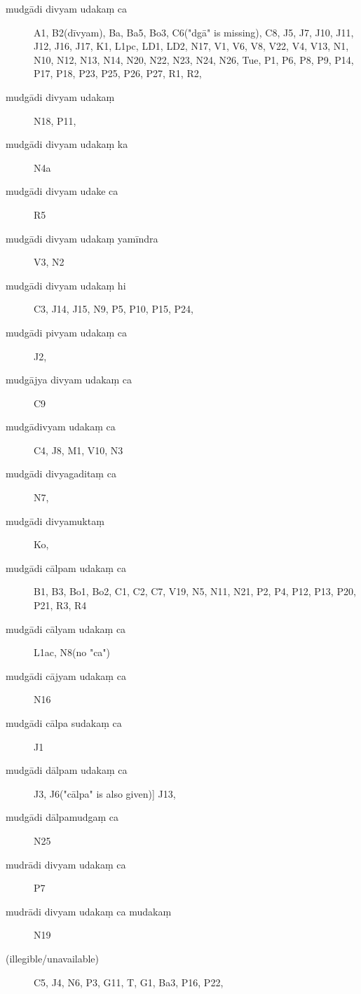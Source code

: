 \begin{ekdosis}
\begin{marma}[hp01_055]
      
\begin{marma}[hp01_062]
  \begin{description}
  \item[mudgādi divyam udakaṃ ca] A1, B2(dīvyam), Ba, Ba5, Bo3, C6("dgā" is missing), C8, J5, J7, J10, J11, J12, J16, J17, K1, L1pc, LD1, LD2, N17, V1, V6, V8, V22, V4, V13, N1, N10, N12, N13, N14, N20, N22, N23, N24, N26, Tue, P1, P6, P8, P9, P14, P17, P18, P23, P25, P26, P27, R1, R2,
\item[mudgādi divyam udakaṃ]   N18, P11,
\item[mudgādi divyam udakaṃ ka]   N4a
\item[mudgādi divyam udake ca]   R5
\item[mudgādi divyam udakaṃ yamīndra]    V3, N2
\item[mudgādi divyam udakaṃ hi]    C3, J14, J15, N9, P5, P10, P15, P24, 
\item[mudgādi pivyam udakaṃ ca]    J2,
\item[mudgājya divyam udakaṃ ca]    C9
\item[mudgādivyam udakaṃ ca]    C4, J8, M1, V10, N3
\item[mudgādi divyagaditaṃ ca]   N7,
\item[mudgādi divyamuktaṃ]    Ko,
\item[mudgādi cālpam udakaṃ ca]    B1, B3, Bo1, Bo2, C1, C2, C7, V19, N5, N11, N21, P2, P4, P12, P13, P20, P21, R3, R4
\item[mudgādi cālyam udakaṃ ca]    L1ac, N8(no "ca")
\item[mudgādi cājyam udakaṃ ca]    N16
\item[mudgādi cālpa sudakaṃ ca]     J1
\item[mudgādi dālpam udakaṃ ca]    J3, J6("cālpa" is also given)] J13,
\item[mudgādi dālpamudgaṃ ca]    N25
\item[mudrādi divyam udakaṃ ca]  P7
\item[mudrādi divyam udakaṃ ca mudakaṃ]    N19
\item[(illegible/unavailable)]       C5, J4, N6, P3, G11, T, G1, Ba3, P16, P22,
    \end{description}


\end{marma}
\end{marma}
\end{ekdosis}
